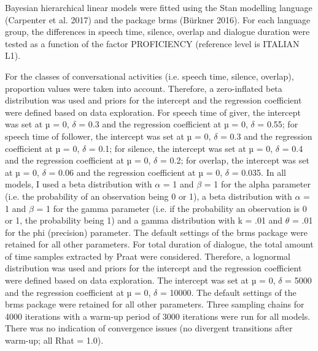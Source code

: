 \begin{styleStandard}
Bayesian hierarchical linear models were fitted using the Stan modelling language (Carpenter et al. 2017) and the package brms (Bürkner 2016). For each language group, the differences in speech time, silence, overlap and dialogue duration were tested as a function of the factor PROFICIENCY (reference level is ITALIAN L1).
\end{styleStandard}

\begin{styleStandard}
For the classes of conversational activities (i.e. speech time, silence, overlap), proportion values were taken into account. Therefore, a zero-inflated beta distribution was used and priors for the intercept and the regression coefficient were defined based on data exploration. For speech time of giver, the intercept was set at µ = 0, $\delta $ = 0.3 and the regression coefficient at µ = 0, $\delta $ = 0.55; for speech time of follower, the intercept was set at µ = 0, $\delta $ = 0.3 and the regression coefficient at µ = 0, $\delta $ = 0.1; for silence, the intercept was set at µ = 0, $\delta $ = 0.4 and the regression coefficient at µ = 0, $\delta $ = 0.2; for overlap, the intercept was set at µ = 0, $\delta $ = 0.06 and the regression coefficient at µ = 0, $\delta $ = 0.035. In all models, I used a beta distribution with $\alpha $ = 1 and $\beta $ = 1 for the alpha parameter (i.e. the probability of an observation being 0 or 1), a beta distribution with $\alpha $ = 1 and $\beta $ = 1 for the gamma parameter (i.e. if the probability an observation is 0 or 1, the probability being 1) and a gamma distribution with k = .01 and $\theta $ = .01 for the phi (precision) parameter. The default settings of the brms package were retained for all other parameters. For total duration of dialogue, the total amount of time samples extracted by Praat were considered. Therefore, a lognormal distribution was used and priors for the intercept and the regression coefficient were defined based on data exploration. The intercept was set at µ = 0, $\delta $ = 5000 and the regression coefficient at µ = 0, $\delta $ = 10000. The default settings of the brms package were retained for all other parameters. Three sampling chains for 4000 iterations with a warm-up period of 3000 iterations were run for all models. There was no indication of convergence issues (no divergent transitions after warm-up; all Rhat = 1.0).
\end{styleStandard}

